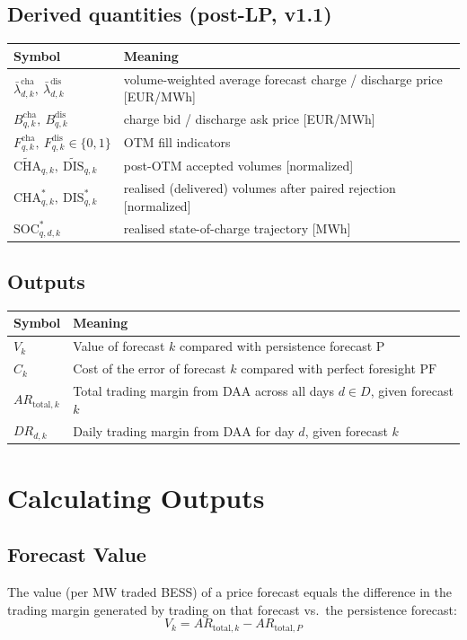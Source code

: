 \documentclass{article}
\numberwithin{equation}{subsection}
\begin{document}
\subsection*{Derived quantities (post-LP, v1.1)}
\begingroup
\renewcommand{\arraystretch}{1.5}
\begin{tabular}{@{}ll@{}}
\toprule
Symbol & Meaning \\
\midrule
\(\bar{\lambda}^{\text{cha}}_{d,k},\ \bar{\lambda}^{\text{dis}}_{d,k}\) & volume-weighted average forecast charge / discharge price [EUR/MWh] \\
\(B^{\text{cha}}_{q,k},\ B^{\text{dis}}_{q,k}\) & charge bid / discharge ask price [EUR/MWh] \\
\(F^{\text{cha}}_{q,k},\ F^{\text{dis}}_{q,k} \in \{0,1\}\) & OTM fill indicators \\
\(\widetilde{\mathrm{CHA}}_{q,k},\ \widetilde{\mathrm{DIS}}_{q,k}\) & post-OTM accepted volumes [normalized] \\
\(\mathrm{CHA}^{*}_{q,k},\ \mathrm{DIS}^{*}_{q,k}\) & realised (delivered) volumes after paired rejection [normalized] \\
\(\mathrm{SOC}^{*}_{q,d,k}\) & realised state-of-charge trajectory [MWh] \\
\bottomrule
\end{tabular}
\endgroup

\subsection*{Outputs}
\begin{tabular}{@{}ll@{}}
\toprule
Symbol & Meaning \\
\midrule
\(V_k\) & Value of forecast \(k\) compared with persistence forecast \(\mathrm{P}\) \\
\(C_k\) & Cost of the error of forecast \(k\) compared with perfect foresight \(\mathrm{PF}\) \\
\(AR_{\text{total}, k}\) & Total trading margin from DAA across all days \(d \in D\), given forecast \(k\) \\
\(DR_{d, k}\) & Daily trading margin from DAA for day \(d\), given forecast \(k\) \\
\bottomrule
\end{tabular}


\section{Calculating Outputs}

\subsection{Forecast Value}
The value (per MW traded BESS) of a price forecast equals the difference in the trading margin generated by trading on that forecast vs.\ the persistence forecast:
\begin{equation}
V_k = AR_{\text{total},k} - AR_{\text{total},P}
\end{equation}
\end{document}
